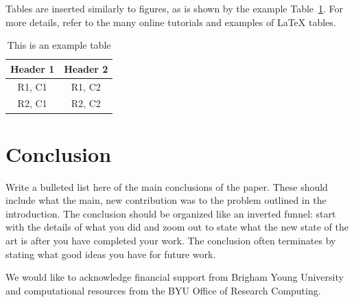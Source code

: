 \documentclass[journal=mamobx, layout=twocolumn]{achemso}
\begin{document}
Tables are inserted similarly to figures, as is shown by the example Table~\ref{tab-example}.
For more details, refer to the many online tutorials and examples of LaTeX tables.

\begin{table}
\caption{This is an example table}
\label{tab-example}
\begin{tabular}{cc}
\hline
Header 1 & Header 2 \\
\hline
R1, C1 & R1, C2 \\
R2, C1 & R2, C2 \\
\hline
\end{tabular}
\end{table}


\section{Conclusion}
Write a bulleted list here of the main conclusions of the paper.
These should include what the main, new contribution was to the problem outlined in the introduction.
The conclusion should be organized like an inverted funnel: start with the details of what you did and zoom out to state what the new state of the art is after you have completed your work.
The conclusion often terminates by stating what good ideas you have for future work.

\begin{acknowledgement}
We would like to acknowledge financial support from Brigham Young University and computational resources from the BYU Office of Research Computing.
\end{acknowledgement}

\clearpage

\end{document}
